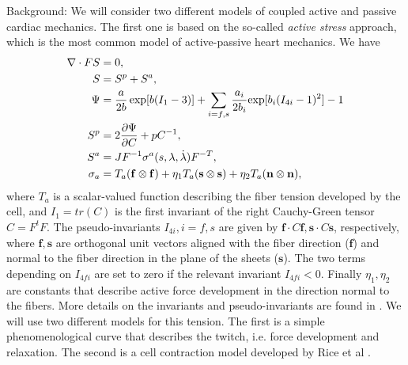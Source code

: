 \documentclass[epsfig,11pt]{article}
\newcommand{\f}{\mathbf f}
\newcommand{\s}{\mathbf s}
\newcommand{\n}{\mathbf n}
\begin{document}
\begin{description}
\item{Background:}
We will consider two different models of coupled active and passive cardiac mechanics. The first one is based on the
so-called \emph{active stress} approach, which is the most common model of active-passive heart mechanics. We have
\begin{align}
\nabla\cdot FS &= 0,  \label{elasticity_1} \\
S  &= S^p + S^a,  \label{stress_split} \\
\Psi &= \frac{a}{2b} \exp[b(I_1-3)] + \sum_{i=f,s} \frac{a_i}{2b_i}{\exp[b_i(I_{4i}-1)^2]-1} \label{strain_energy1} \\
S^p &= 2{\partial\Psi\over\partial C}+pC^{-1}, \\
S^a &= J F^{-1}\sigma^a(s,\lambda,\dot{\lambda})F^{-T}, \label{active_s} \\
\sigma_a &= T_a (\f \otimes \f) + \eta_1 T_a (\s\otimes\s) +\eta_2 T_a (\n \otimes\n) , \label{active_s2}
\end{align}
where $T_a$ is a scalar-valued function describing the fiber tension developed by the cell, and $I_1 = tr(C)$ is the first invariant of the right Cauchy-Green tensor $C=F^tF$. The pseudo-invariants $I_{4i}, i=f,s$ are given by $\f\cdot C\f, \s\cdot C\s$, respectively, where $\f,\s$ are orthogonal unit vectors aligned with the fiber direction ($\f$) and normal to the fiber direction in the plane of the sheets ($\s$). The two terms depending on $I_{4fi}$ are set to zero if the relevant invariant $I_{4fi} < 0$. Finally $\eta_1, \eta_2$ are constants that describe active force development in the direction normal to the fibers. More details on the invariants and pseudo-invariants are found in \cite{Holzapfel:2009bb}. We will use two different models for this tension. The first is a simple phenomenological curve that describes the twitch, i.e. force development and relaxation. The second is a cell contraction model developed by Rice et al \cite{Rice:2008jd}. 


\end{description}
\end{document}
